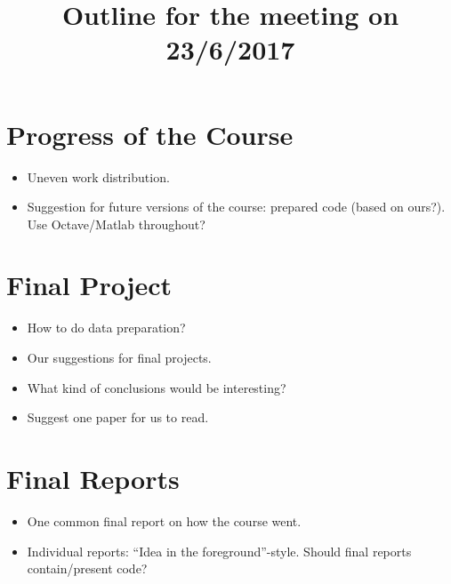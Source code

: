 \documentclass[•]{article}
\title{Outline for the meeting on 23/6/2017}
\begin{document}
\maketitle
\section{Progress of the Course}
\begin{itemize}
\item Uneven work distribution.
\item Suggestion for future versions of the course: prepared code (based on ours?). Use Octave/Matlab throughout?

\end{itemize}
\section{Final Project}
\begin{itemize}
\item How to do data preparation?
\item Our suggestions for final projects.
\item What kind of conclusions would be interesting?
\item Suggest one paper for us to read.

\end{itemize}

\section{Final Reports}
\begin{itemize}
\item One common final report on how the course went.
\item Individual reports:
\subitem ``Idea in the foreground''-style.
\subitem Should final reports contain/present code?
\end{itemize}
\end{document}

